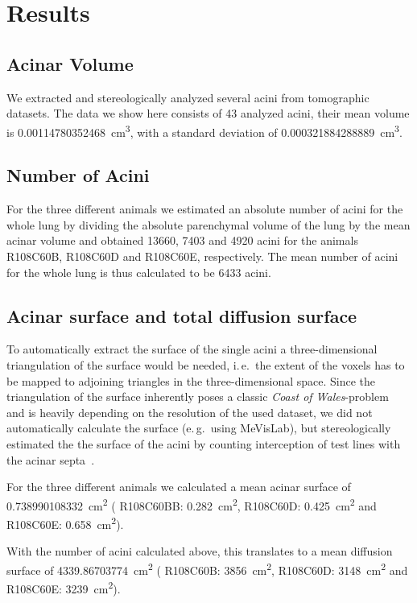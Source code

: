 \documentclass[paper=a4,abstract=true,english,DIV=calc]{scrartcl}
\newcommand{\ie}{i.\,e.\ }
\newcommand{\eg}{e.\,g.\ }
\newcommand{\numberofacini}{43}
\newcommand{\meantotalnumberofacini}{6433}
\newcommand{\meanacinarvolume}{0.00114780352468} %
\newcommand{\std}{0.000321884288889} %
\newcommand{\acinarsurface}{0.738990108332} %
\newcommand{\meanairspacesurface}{4339.86703774} %
\begin{document}
\section{Results}
\label{sec:results}
\subsection{Acinar Volume}
We extracted and stereologically analyzed several acini from tomographic datasets.
The data we show here consists of \numberofacini\xspace analyzed acini, their mean volume is \SI{\meanacinarvolume}{\centi\metre\cubed}, with a standard deviation of \SI{\std}{\centi\metre\cubed}.

\subsection{Number of Acini}
For the three different animals we estimated an absolute number of acini for the whole lung by dividing the absolute parenchymal volume of the lung by the mean acinar volume and obtained 13660, 7403 and 4920 acini for the animals R108C60B, R108C60D and R108C60E, respectively.
The mean number of acini for the whole lung is thus calculated to be \meantotalnumberofacini\xspace acini.

\subsection{Acinar surface and total diffusion surface}
To automatically extract the surface of the single acini a three-dimensional triangulation of the surface would be needed, \ie the extent of the voxels has to be mapped to adjoining triangles in the three-dimensional space.
Since the triangulation of the surface inherently poses a classic \emph{Coast of Wales}-problem~\cite{Mandelbrot1967a} and is heavily depending on the resolution of the used dataset, we did not automatically calculate the surface (\eg using MeVisLab), but stereologically estimated the the surface of the acini by counting interception of test lines with the acinar septa~\cite{Hsia2010}.

For the three different animals we calculated a mean acinar surface of \SI{\acinarsurface}{\centi\metre\squared} (
R108C60BB: \SI{0.282}{\centi\metre\squared},
R108C60D: \SI{0.425}{\centi\metre\squared} and
R108C60E: \SI{0.658}{\centi\metre\squared}).

With the number of acini calculated above, this translates to a mean diffusion surface of \SI{\meanairspacesurface}{\centi\metre\squared} (
R108C60B: \SI{3856}{\centi\metre\squared},
R108C60D: \SI{3148}{\centi\metre\squared} and
R108C60E: \SI{3239}{\centi\metre\squared}).
\end{document}
